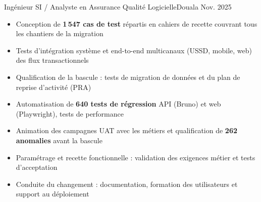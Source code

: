 %
%
%


\begin{experiences}
     {Ingénieur SI / Analyste en Assurance Qualité Logicielle}{}{Douala}
    {Nov. 2025} {
                      \begin{itemize}
                        \item Conception de \textbf{1\,547 cas de test} répartis en cahiers de recette couvrant tous les chantiers de la migration
                        \item Tests d'intégration système et end-to-end multicanaux (USSD, mobile, web) des flux transactionnels
                        \item Qualification de la bascule : tests de migration de données et du plan de reprise d'activité (PRA)
                        \item Automatisation de \textbf{640 tests de régression} API (Bruno) et web (Playwright), tests de performance
                        \item Animation des campagnes UAT avec les métiers et qualification de \textbf{262 anomalies} avant la bascule                      
                      \end{itemize}
                      \begin{itemize}
                        \item Paramétrage et recette fonctionnelle : validation des exigences métier et tests d'acceptation
                        \item Conduite du changement : documentation, formation des utilisateurs et support au déploiement

\end{itemize}}
\end{experiences}
